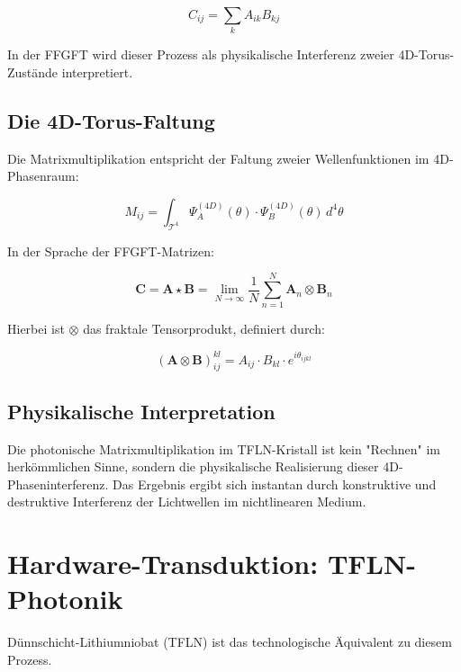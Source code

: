 	\begin{equation}
		C_{ij} = \sum_{k} A_{ik} B_{kj}
	\end{equation}
	
	In der FFGFT wird dieser Prozess als physikalische Interferenz zweier 4D-Torus-Zustände interpretiert.
	
	\subsection{Die 4D-Torus-Faltung}
	
	Die Matrixmultiplikation entspricht der Faltung zweier Wellenfunktionen im 4D-Phasenraum:
	
	\begin{equation}
		M_{ij} = \int_{\mathcal{T}^4} \Psi_A^{(4D)}(\theta) \cdot \Psi_B^{(4D)}(\theta) \, d^4\theta
	\end{equation}
	
	In der Sprache der FFGFT-Matrizen:
	
	\begin{equation}
		\mathbf{C} = \mathbf{A} \star \mathbf{B} = \lim_{N \to \infty} \frac{1}{N} \sum_{n=1}^{N} \mathbf{A}_n \otimes \mathbf{B}_n
	\end{equation}
	
	Hierbei ist $\otimes$ das fraktale Tensorprodukt, definiert durch:
	
	\begin{equation}
		(\mathbf{A} \otimes \mathbf{B})_{ij}^{kl} = A_{ij} \cdot B_{kl} \cdot e^{i \theta_{ijkl}}
	\end{equation}
	
	\subsection{Physikalische Interpretation}
	
	Die photonische Matrixmultiplikation im TFLN-Kristall ist kein "Rechnen" im herkömmlichen Sinne, sondern die physikalische Realisierung dieser 4D-Phaseninterferenz. Das Ergebnis ergibt sich instantan durch konstruktive und destruktive Interferenz der Lichtwellen im nichtlinearen Medium.
	
	\section{Hardware-Transduktion: TFLN-Photonik}
	
	Dünnschicht-Lithiumniobat (TFLN) ist das technologische Äquivalent zu diesem Prozess.
	
